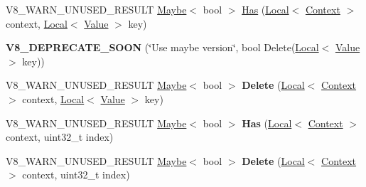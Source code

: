 \begin{DoxyCompactItemize}
\item 
V8\+\_\+\+W\+A\+R\+N\+\_\+\+U\+N\+U\+S\+E\+D\+\_\+\+R\+E\+S\+U\+LT \mbox{\hyperlink{classv8_1_1Maybe}{Maybe}}$<$ bool $>$ \mbox{\hyperlink{classv8_1_1Object_a57d4819c2cc13715ed22dd23cdc84d7c}{Has}} (\mbox{\hyperlink{classv8_1_1Local}{Local}}$<$ \mbox{\hyperlink{classv8_1_1Context}{Context}} $>$ context, \mbox{\hyperlink{classv8_1_1Local}{Local}}$<$ \mbox{\hyperlink{classv8_1_1Value}{Value}} $>$ key)
\item 
\mbox{\label{classv8_1_1Object_ad76afc75f558f317a80b4f4b83c5cd53}} 
{\bfseries V8\+\_\+\+D\+E\+P\+R\+E\+C\+A\+T\+E\+\_\+\+S\+O\+ON} (\char`\"{}Use maybe version\char`\"{}, bool Delete(\mbox{\hyperlink{classv8_1_1Local}{Local}}$<$ \mbox{\hyperlink{classv8_1_1Value}{Value}} $>$ key))
\item 
\mbox{\label{classv8_1_1Object_abef69eff95cf01271a45cf4ccb9db599}} 
V8\+\_\+\+W\+A\+R\+N\+\_\+\+U\+N\+U\+S\+E\+D\+\_\+\+R\+E\+S\+U\+LT \mbox{\hyperlink{classv8_1_1Maybe}{Maybe}}$<$ bool $>$ {\bfseries Delete} (\mbox{\hyperlink{classv8_1_1Local}{Local}}$<$ \mbox{\hyperlink{classv8_1_1Context}{Context}} $>$ context, \mbox{\hyperlink{classv8_1_1Local}{Local}}$<$ \mbox{\hyperlink{classv8_1_1Value}{Value}} $>$ key)
\item 
\mbox{\label{classv8_1_1Object_adfbff82d3a45a69415ae99013a654daa}} 
V8\+\_\+\+W\+A\+R\+N\+\_\+\+U\+N\+U\+S\+E\+D\+\_\+\+R\+E\+S\+U\+LT \mbox{\hyperlink{classv8_1_1Maybe}{Maybe}}$<$ bool $>$ {\bfseries Has} (\mbox{\hyperlink{classv8_1_1Local}{Local}}$<$ \mbox{\hyperlink{classv8_1_1Context}{Context}} $>$ context, uint32\+\_\+t index)
\item 
\mbox{\label{classv8_1_1Object_ac4acbd87ab5773845ec5be1737b6a2bb}} 
V8\+\_\+\+W\+A\+R\+N\+\_\+\+U\+N\+U\+S\+E\+D\+\_\+\+R\+E\+S\+U\+LT \mbox{\hyperlink{classv8_1_1Maybe}{Maybe}}$<$ bool $>$ {\bfseries Delete} (\mbox{\hyperlink{classv8_1_1Local}{Local}}$<$ \mbox{\hyperlink{classv8_1_1Context}{Context}} $>$ context, uint32\+\_\+t index)
\item 

\end{DoxyCompactItemize}

